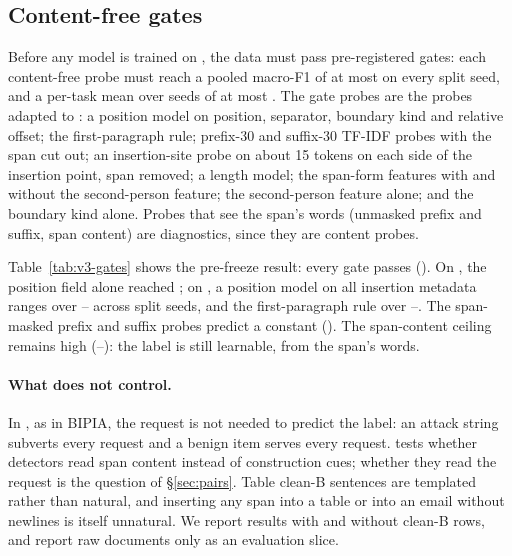 \subsection{Content-free gates}
\label{sec:v3:gates}
Before any model is trained on \vthree{}, the data must pass pre-registered gates: each content-free probe must reach
a pooled macro-F1 of at most  on every split seed, and a per-task mean over seeds of
at most . The gate probes are the \vtwo{} probes adapted to \vthree{}: a position
model on position, separator, boundary kind and relative offset; the first-paragraph rule; prefix-30 and suffix-30
TF-IDF probes with the span cut out; an insertion-site probe on about 15 tokens on each side of the insertion point,
span removed; a length model; the span-form features with and without the second-person feature; the second-person
feature alone; and the boundary kind alone. Probes that see the span's words (unmasked prefix and suffix, span
content) are diagnostics, since they are content probes.

Table~\ref{tab:v3-gates} shows the pre-freeze result: every gate passes (). On \vtwo{}, the
position field alone reached ; on \vthree{}, a position model on
all insertion metadata ranges over
-- across split seeds, and the
first-paragraph rule over --.
The span-masked prefix and suffix probes predict a constant
(). The span-content ceiling remains high
(--): the label is still
learnable, from the span's words.

\begin{table}[t]
\centering
\resizebox{\columnwidth}{!}{}
\caption{\vthree{} content-free gates, pre-freeze build on the draft benign pool. Pooled macro-F1 range over split
seeds 0--4 and per-task means over seeds. Gate: $\leq$\, on every seed and every
task mean. \emph{diag}: content probes, reported but not gated.}
\label{tab:v3-gates}
\end{table}

\paragraph{What \vthree{} does not control.}
In \vthree{}, as in BIPIA, the request is not needed to predict the label: an attack string subverts every request
and a benign item serves every request. \vthree{} tests whether detectors read span content instead of construction
cues; whether they read the request is the question of \S\ref{sec:pairs}. Table clean-B sentences are templated
rather than natural, and inserting any span into a table or into an email without newlines is itself unnatural.
We report results with and without clean-B rows, and report raw documents only as an evaluation slice.
